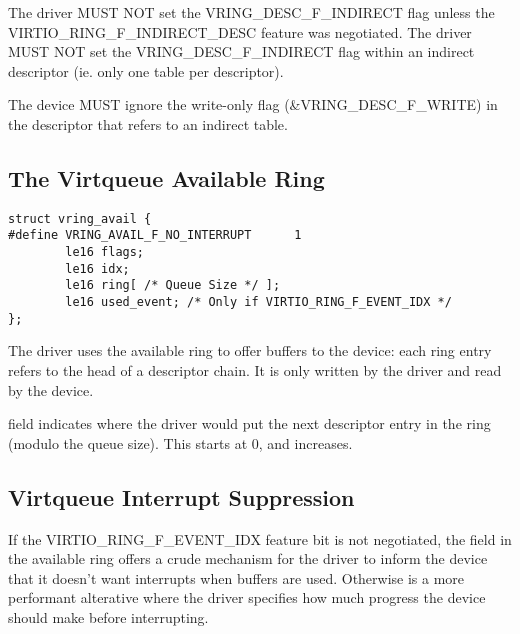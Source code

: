 The driver MUST NOT set the VRING_DESC_F_INDIRECT flag unless the
VIRTIO_RING_F_INDIRECT_DESC feature was negotiated.   The driver MUST NOT
set the VRING_DESC_F_INDIRECT flag within an indirect descriptor (ie. only
one table per descriptor).

The device MUST ignore the write-only flag (\&VRING_DESC_F_WRITE) in the descriptor that refers to an indirect table.

\subsection{The Virtqueue Available Ring}\label{sec:Basic Facilities of a Virtio Device / Virtqueues / The Virtqueue Available Ring}

\begin{lstlisting}
struct vring_avail {
#define VRING_AVAIL_F_NO_INTERRUPT      1
        le16 flags;
        le16 idx;
        le16 ring[ /* Queue Size */ ];
        le16 used_event; /* Only if VIRTIO_RING_F_EVENT_IDX */
};
\end{lstlisting}

The driver uses the available ring to offer buffers to the
device: each ring entry refers to the head of a descriptor chain.  It is only
written by the driver and read by the device.

 field indicates where the driver would put the next descriptor
entry in the ring (modulo the queue size). This starts at 0, and increases.

\subsection{Virtqueue Interrupt Suppression}\label{sec:Basic Facilities of a Virtio Device / Virtqueues / Virtqueue Interrupt Suppression}

If the VIRTIO_RING_F_EVENT_IDX feature bit is not negotiated,
the  field in the available ring offers a crude mechanism for the driver to inform
the device that it doesn't want interrupts when buffers are used.  Otherwise
 is a more performant alterative where the driver
specifies how much progress the device should make before interrupting.

